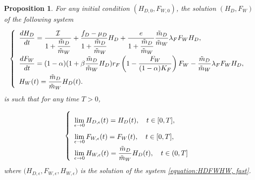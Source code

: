 \documentclass{article}
\newcommand{\lfw}{\lambda_{F}}
\newcommand{\lfw}{\lambda_{F}}
\newcommand{\cI}{\mathcal{I}}
\newcommand{\mW}{\tilde{m}_W}
\newcommand{\mD}{\tilde{m}_D}
\newtheorem{prop}[theorem]{Proposition}
\theoremstyle{definition}
\theoremstyle{remark}
\begin{document}
\begin{prop}
For any initial condition $(H_{D,0}, F_{W, 0})$, the solution $(H_D, F_W)$  of the following system
\begin{equation}
\def\arraystretch{2}
\left\lbrace \begin{array}{l}
\dfrac{dH_D}{dt} = \dfrac{\cI}{1+ \dfrac{\mD}{\mW}} + \dfrac{f_D - \mu_D}{1+\dfrac{\mD}{\mW}} H_D + \dfrac{e}{1+\dfrac{\mD}{\mW}} \dfrac{\mD}{\mW} \lfw F_WH_D, \\
\dfrac{dF_W}{dt} = (1-\alpha) (1+\beta \dfrac{\mD}{\mW} H_D) r_F \left(1 - \dfrac{F_W}{(1-\alpha)K_F} \right) F_W - \dfrac{\mD}{\mW} \lfw F_W H_D, \\
H_W(t) = \dfrac{\mD}{\mW} H_D(t).
\end{array} \right.
\label{equation:HDFW}
\end{equation} is such that for any time $T > 0$, 

\begin{equation*}
\def\arraystretch{2}
\left\lbrace \begin{array}{l}
\lim\limits_{ \epsilon \rightarrow 0}{H_{D, \epsilon}(t)} = H_D(t), \quad t \in [0,T], \\
\lim\limits_{ \epsilon \rightarrow 0} F_{W,  \epsilon}(t) = F_W(t),\quad t \in [0,T], \\
 \lim\limits_{ \epsilon \rightarrow 0} H_{W,  \epsilon}(t) = \dfrac{\mD}{\mW} H_D(t), \quad  t\in (0,T] \\
\end{array} \right.
\end{equation*}
where $\Big(H_{D, \epsilon}, F_{W,  \epsilon}, H_{W,  \epsilon} \Big)$ is the solution of the system \eqref{equation:HDFWHW, fast}.

\end{prop}
\end{document}
